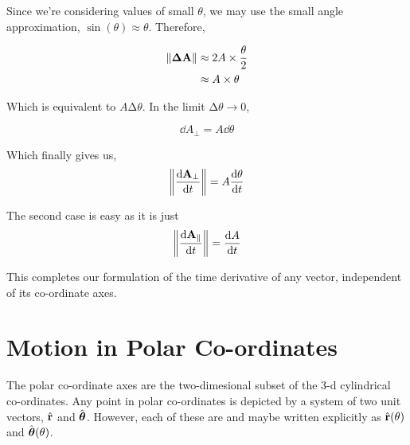 
\begin{figure}
    [H]
    \centering
\end{figure}


Since we're considering values of small \(\theta\), we may use the small angle approximation,
\(\sin(\theta) \approx \theta\). Therefore,

\begin{align}
    \norm{\boldsymbol{\mathbf{\Delta A}}} &\approx 2A \times \frac{\theta}{2}\\ 
    &\approx A \times \theta
\end{align}

Which is equivalent to \(A \increment \theta\). In the limit \(\increment \theta \to 0\),

\begin{equation}
    \dd{A_{\perp}} = A \dd{\theta}
\end{equation}

Which finally gives us,
\begin{equation}
    \norm{\dv{\boldsymbol{\mathbf{A}}_{\perp}}{t}} = A\dv{\theta}{t}
\end{equation}

The second case is easy as it is just 
\begin{equation}
    \norm{\dv{\boldsymbol{\mathbf{A}}_{\parallel}}{t}} = \dv{A}{t}
\end{equation}
    
This completes our formulation of the time derivative of any vector, independent of its co-ordinate
axes.

\section{Motion in Polar Co-ordinates}

The polar co-ordinate axes are the two-dimesional subset of the 3-d cylindrical co-ordinates. 
Any point in polar co-ordinates is depicted by a system of two unit vectors, \({\hat{\boldsymbol{\mathbf{r}}}}\) and
\({\hat{\boldsymbol{\mathbf{\theta}}}}\). However, each of these are  and
maybe written explicitly as \({\hat{\boldsymbol{\mathbf{r}}}}(\theta)\) and \({\hat{\boldsymbol{\mathbf{\theta}}}}(\theta)\).  

